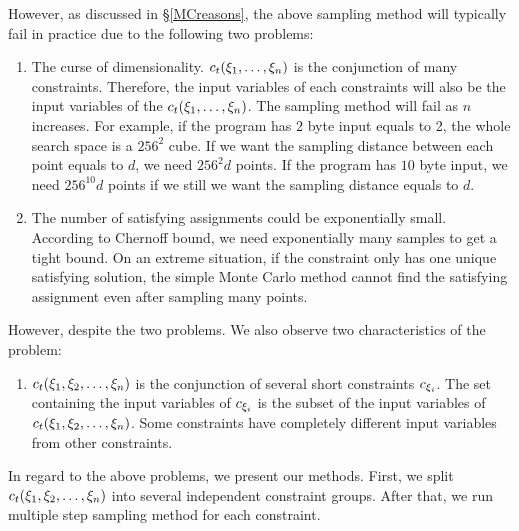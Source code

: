 However, as discussed in \S\ref{MCreasons},
the above sampling method will typically fail in practice due to the following two problems:

\begin{enumerate}
      \item The curse of dimensionality. $c_t({{\xi}_{1}},\ldots,{{\xi}_{n}})$ is 
      the conjunction of many constraints. 
      Therefore, the input variables of each constraints will also be 
      the input variables of the $c_t({{\xi}_{1}},\ldots,{{\xi}_{n}})$. 
      The sampling method will fail as 
      $n$ increases. For example, if the program has $2$ byte input equals to 2, 
      the whole search space is 
      a $256^2$ cube. If we want the sampling distance between each point equals to $d$,
      we need $256^2d$ points. If the program has $10$ byte input, 
      we need $256^{10}d$ points if we 
      still we want the sampling distance equals to $d$. 

      \item The number of satisfying assignments could be exponentially small.
      According to Chernoff bound, we need exponentially many samples to get 
      a tight bound. On an extreme situation, if the constraint only has one unique
      satisfying solution, the simple Monte Carlo method cannot find the satisfying
      assignment even after sampling many points.
\end{enumerate}

However, despite the two problems. We also observe two characteristics
of the problem:
\begin{enumerate}
      \item $c_t({{\xi}_{1}},{{\xi}_{2}},\ldots,{{\xi}_{n}})$ is the conjunction of several
      short constraints $c_{{\xi}_{i}}$. The set containing the input variables of 
      $c_{{\xi}_{i}}$ is the subset of the input variables of 
      $c_t({{\xi}_{1}},{{\xi}_{2}},\ldots,{{\xi}_{n}})$.
      Some constraints have completely different input variables from other constraints.
      
\end{enumerate}

In regard to the above problems, we present our methods. First, we split 
$c_t({\xi}_{1},{\xi}_{2},\ldots,{\xi}_{n})$ into several independent constraint groups. After
that, we run multiple step sampling method for each constraint.

